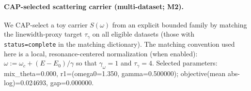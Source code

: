 \paragraph{CAP-selected scattering carrier (multi-dataset; M2).} \AuditTag We CAP-select a toy carrier $S(\omega)$ from an explicit bounded family by matching the linewidth-proxy target $\tau_\gamma$ on all eligible datasets (those with \texttt{status=complete} in the matching dictionary). The matching convention used here is a local, resonance-centered normalization (when enabled): $\omega:=\omega_c+(E-E_0)/\gamma$ so that $\gamma_\omega=1$ and $\tau_\gamma=4$. Selected parameters: mix\_theta=0.000, r1=(omega0=1.350, gamma=0.500000); objective(mean abs-log)=0.024693, gap=0.000000.